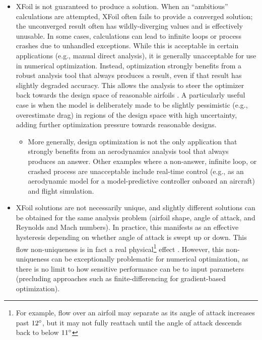 \documentclass[conf]{new-aiaa}
\begin{document}
    \begin{itemize}
        \item XFoil is not guaranteed to produce a solution. When an ``ambitious'' calculations are attempted, XFoil often fails to provide a converged solution; the unconverged result often has wildly-diverging values and is effectively unusable. In some cases, calculations can lead to infinite loops or process crashes due to unhandled exceptions. While this is acceptable in certain applications (e.g., manual direct analysis), it is generally unacceptable for use in numerical optimization. Instead, optimization strongly benefits from a robust analysis tool that always produces a result, even if that result has slightly degraded accuracy. This allows the analysis to steer the optimizer back towards the design space of reasonable airfoils \cite{he2019robust}. A particularly useful case is when the model is deliberately made to be slightly pessimistic (e.g., overestimate drag) in regions of the design space with high uncertainty, adding further optimization pressure towards reasonable designs.
        \begin{itemize}
            \item More generally, design optimization is not the only application that strongly benefits from an aerodynamics analysis tool that always produces an answer. Other examples where a non-answer, infinite loop, or crashed process are unacceptable include real-time control (e.g., as an aerodynamic model for a model-predictive controller onboard an aircraft) and flight simulation.
        \end{itemize}
        \item XFoil solutions are not necessarily unique, and slightly different solutions can be obtained for the same analysis problem (airfoil shape, angle of attack, and Reynolds and Mach numbers). In practice, this manifests as an effective hysteresis depending on whether angle of attack is swept up or down. This flow non-uniqueness is in fact a real physical\footnote{For example, flow over an airfoil may separate as its angle of attack increases past $12\degree$, but it may not fully reattach until the angle of attack descends back to below $11\degree$} effect \cite{jameson_airfoils_1991, kuzmin2012non, he2019robust}. However, this non-uniqueness can be exceptionally problematic for numerical optimization, as there is no limit to how sensitive performance can be to input parameters (precluding approaches such as finite-differencing for gradient-based optimization).

\end{itemize}
\end{document}

